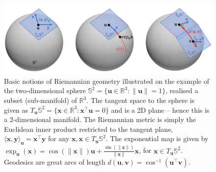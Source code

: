 \begin{figure}[h!]
    \centering
    \includegraphics[width=\linewidth]{figures/manifold.png}
    \caption{
    Basic notions of Riemannian geometry illustrated on the example of the two-dimensional sphere $\mathbb{S}^2 = \{\mathbf{u}\in \mathbb{R}^3 : \|\mathbf{u}\|=1 \}$, realised a subset (sub-manifold) of $\mathbb{R}^3$. 
%
The tangent space to the sphere is given as $T_\mathbf{u}\mathbb{S}^2 = \{ \mathbf{x}\in \mathbb{R}^3 : \mathbf{x}^\top \mathbf{u} = 0\}$ and is a 2D plane -- hence this is a 2-dimensional manifold. The Riemannian metric is simply the Euclidean inner product restricted to the tangent plane, $\langle \mathbf{x}, \mathbf{y}\rangle_\mathbf{u} = \mathbf{x}^\top \mathbf{y}$ for any $\mathbf{x},\mathbf{x}\in T_\mathbf{u}\mathbb{S}^2$. 
The exponential map is given by 
$\exp_\mathbf{u}(\mathbf{x}) = \cos(\| \mathbf{x}\|)\mathbf{u} + \frac{\sin(\| \mathbf{x}\|)}{\|\mathbf{x}\|} \mathbf{x}$, for $\mathbf{x} \in T_\mathbf{u}\mathbb{S}^2$. 
%
Geodesics are great arcs of length $d(\mathbf{u},\mathbf{v}) = \cos^{-1}(\mathbf{u}^\top \mathbf{v})$.
    }
    \label{fig:sphere_metric}
\end{figure}%


%

%
%



